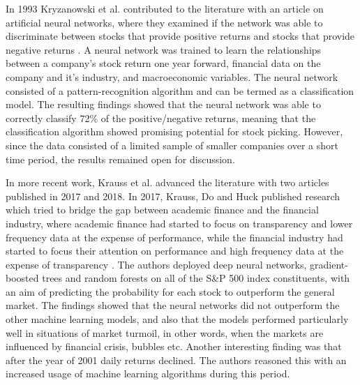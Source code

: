 \indent\newline
In 1993 Kryzanowski et al. contributed to the literature with an article on artificial neural networks, where they examined if the network was able to discriminate between stocks that provide positive returns and stocks that provide negative returns \cite{kryz}. A neural network was trained to learn the relationships between a company's stock return one year forward, financial data on the company and it's industry, and macroeconomic variables. The neural network consisted of a pattern-recognition algorithm and can be termed as a classification model. The resulting findings showed that the neural network was able to correctly classify 72\% of the positive/negative returns, meaning that the classification algorithm showed promising potential for stock picking. However, since the data consisted of a limited sample of smaller companies over a short time period, the results remained open for discussion.

\indent\newline
In more recent work, Krauss et al. advanced the literature with two articles published in 2017 and 2018. In 2017, Krauss, Do and Huck published research which tried to bridge the gap between academic finance and the financial industry, where academic finance had started to focus on transparency and lower frequency data at the expense of performance, while the financial industry had started to focus their attention on performance and high frequency data at the expense of transparency \cite{huck}. The authors deployed deep neural networks, gradient-boosted trees and random forests on all of the S\&P 500 index constituents, with an aim of predicting the probability for each stock to outperform the general market. The findings showed that the neural networks did not outperform the other machine learning models, and also that the models performed particularly well in situations of market turmoil, in other words, when the markets are influenced by financial crisis, bubbles etc. Another interesting finding was that after the year of 2001 daily returns declined. The authors reasoned this with an increased usage of machine learning algorithms during this period. 

